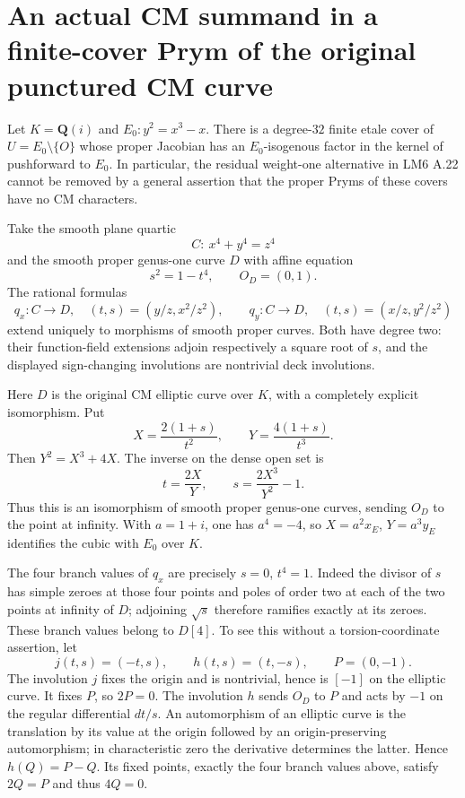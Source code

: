 \section*{An actual CM summand in a finite-cover Prym of the original punctured CM curve}
Let $K=\mathbf Q(i)$ and $E_0:y^2=x^3-x$. There is a degree-$32$ finite etale cover of $U=E_0\setminus\{O\}$ whose proper Jacobian has an $E_0$-isogenous factor in the kernel of pushforward to $E_0$. In particular, the residual weight-one alternative in LM6 A.22 cannot be removed by a general assertion that the proper Pryms of these covers have no CM characters.

Take the smooth plane quartic
\[
 C:\ x^4+y^4=z^4
\]
and the smooth proper genus-one curve $D$ with affine equation
\[
 s^2=1-t^4,\qquad O_D=(0,1).
\]
The rational formulas
\[
 q_x:C\longrightarrow D,\quad (t,s)=(y/z,x^2/z^2),\qquad
 q_y:C\longrightarrow D,\quad (t,s)=(x/z,y^2/z^2)
\]
extend uniquely to morphisms of smooth proper curves. Both have degree two: their function-field extensions adjoin respectively a square root of $s$, and the displayed sign-changing involutions are nontrivial deck involutions.

Here $D$ is the original CM elliptic curve over $K$, with a completely explicit isomorphism. Put
\[
 X=\frac{2(1+s)}{t^2},\qquad Y=\frac{4(1+s)}{t^3}.
\]
Then $Y^2=X^3+4X$. The inverse on the dense open set is
\[
 t=\frac{2X}{Y},\qquad s=\frac{2X^3}{Y^2}-1.
\]
Thus this is an isomorphism of smooth proper genus-one curves, sending $O_D$ to the point at infinity. With $a=1+i$, one has $a^4=-4$, so $X=a^2x_E$, $Y=a^3y_E$ identifies the cubic with $E_0$ over $K$.

The four branch values of $q_x$ are precisely $s=0$, $t^4=1$. Indeed the divisor of $s$ has simple zeroes at those four points and poles of order two at each of the two points at infinity of $D$; adjoining $\sqrt{s}$ therefore ramifies exactly at its zeroes. These branch values belong to $D[4]$. To see this without a torsion-coordinate assertion, let
\[
 j(t,s)=(-t,s),\qquad h(t,s)=(t,-s),\qquad P=(0,-1).
\]
The involution $j$ fixes the origin and is nontrivial, hence is $[-1]$ on the elliptic curve. It fixes $P$, so $2P=0$. The involution $h$ sends $O_D$ to $P$ and acts by $-1$ on the regular differential $dt/s$. An automorphism of an elliptic curve is the translation by its value at the origin followed by an origin-preserving automorphism; in characteristic zero the derivative determines the latter. Hence $h(Q)=P-Q$. Its fixed points, exactly the four branch values above, satisfy $2Q=P$ and thus $4Q=0$.

